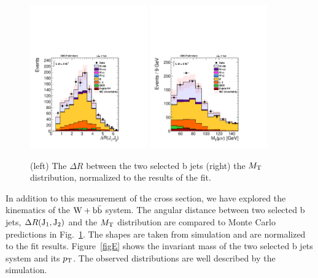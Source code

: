 
\begin{figure}
\centering
\includegraphics[width=0.45\textwidth]{Wbb/fig5.pdf}
\includegraphics[width=0.45\textwidth]{Wbb/fig6.pdf}
\caption{(left) The $\Delta R$ between the two selected b jets
(right) the $M_\mathrm{T}$ distribution, normalized to the results of the fit.}
\label{figD}
\end{figure}

In addition to this measurement of the cross section, we have explored the kinematics of the $\mathrm{W+\mathrm{b\bar{b}}}$ system.
The angular distance between two selected b jets, $\Delta R(\rm{J_1,J_2})$ 
and the $M_\mathrm{T}$ distribution are compared to Monte Carlo predictions 
in Fig.~\ref{figD}. The shapes are taken from simulation and are normalized to the fit results. 
Figure~\ref{figE} shows the invariant mass of the two 
selected b jets system and its $p_\mathrm{T}$.
The observed distributions  are well described by the simulation.


